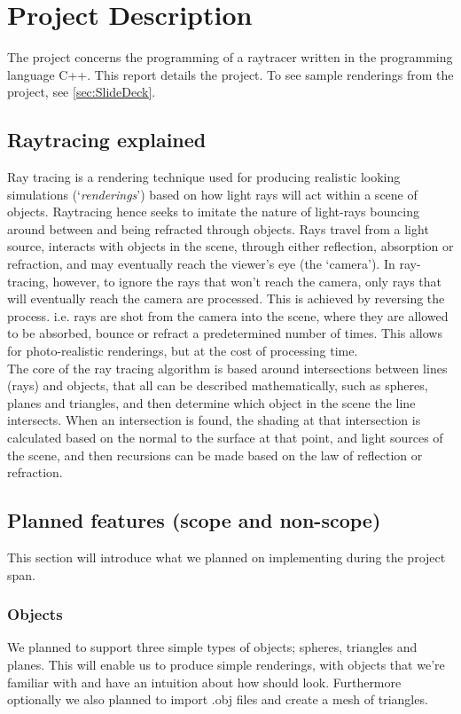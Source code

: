 \section{Project Description}
The project concerns the programming of a raytracer written in the programming language C++. This report details the project. To see sample renderings from the project, see \ref{sec:SlideDeck}. 

\subsection{Raytracing explained}
Ray tracing is a rendering technique used for producing realistic looking simulations (‘\textit{renderings}’) based on how light rays will act within a scene of objects. Raytracing hence seeks to imitate the nature of light-rays bouncing around between and being refracted through objects. Rays travel from a light source, interacts with objects in the scene, through either reflection, absorption or refraction, and may eventually reach the viewer’s eye (the ‘camera’). In ray-tracing, however, to ignore the rays that won’t reach the camera, only rays that will eventually reach the camera are processed. This is achieved by reversing the process. i.e. rays are shot from the camera into the scene, where they are allowed to be absorbed, bounce or refract a predetermined number of times. This allows for photo-realistic renderings, but at the cost of processing time. \\

The core of the ray tracing algorithm is based around intersections between lines (rays) and objects, that all can be described mathematically, such as spheres, planes and triangles, and then determine which object in the scene the line intersects. When an intersection is found, the shading at that intersection is calculated based on the normal to the surface at that point, and light sources of the scene, and then recursions can be made based on the law of reflection or refraction.

\subsection{Planned features (scope and non-scope)}
This section will introduce what we planned on implementing during the project span.

\subsubsection{Objects}
We planned to support three simple types of objects; spheres, triangles and planes. This will enable us to produce simple renderings, with objects that we’re familiar with and have an intuition about how should look. Furthermore optionally we also planned to import .obj files and create a mesh of triangles.

